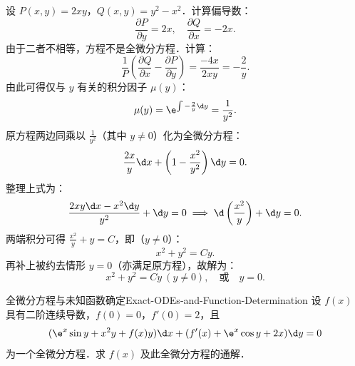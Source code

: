 \begin{solution}
    设 $P(x,y) = 2xy$，$Q(x,y) = y^2 - x^2$．计算偏导数：
    \begin{equation}
        \frac{\partial P}{\partial y} = 2x, \quad \frac{\partial Q}{\partial x} = -2x.
    \end{equation}
    由于二者不相等，方程不是全微分方程．计算：
    \begin{equation}
        \frac{1}{P} \left( \frac{\partial Q}{\partial x} - \frac{\partial P}{\partial y} \right) = \frac{-4x}{2xy} = -\frac{2}{y}.
    \end{equation}
    由此可得仅与 $y$ 有关的积分因子 $\mu(y)$：
    \begin{equation}
        \mu(y) = \e^{\int -\frac{2}{y} \d y} = \frac{1}{y^2}.
    \end{equation}
    原方程两边同乘以 $\frac{1}{y^2}$（其中 $y \neq 0$）化为全微分方程：
    \begin{equation}
        \frac{2x}{y} \d x + \left( 1 - \frac{x^2}{y^2} \right) \d y = 0.
    \end{equation}
    整理上式为：
    \begin{equation}
        \frac{2x y \d x - x^2 \d y}{y^2} + \d y = 0 \implies \d\left( \frac{x^2}{y} \right) + \d y = 0.
    \end{equation}
    两端积分可得 $\frac{x^2}{y} + y = C$，即（$y\neq0$）：
    \begin{equation}
        x^2 + y^2 = Cy.
    \end{equation}
    再补上被约去情形 $y=0$（亦满足原方程），故解为：
    \begin{equation}
        \boxed{x^2 + y^2 = Cy\ (y\neq0),\quad \text{或}\quad y=0.}
    \end{equation}
\end{solution}

\begin{problem}{全微分方程与未知函数确定}{Exact-ODEs-and-Function-Determination}
    设 $f(x)$ 具有二阶连续导数，$f(0) = 0$，$f'(0) = 2$，且
    \begin{equation}
        (\e^x \sin y + x^2y + f(x)y) \d x + (f'(x) + \e^x \cos y + 2x) \d y = 0
    \end{equation}
    为一个全微分方程．求 $f(x)$ 及此全微分方程的通解．
\end{problem}

